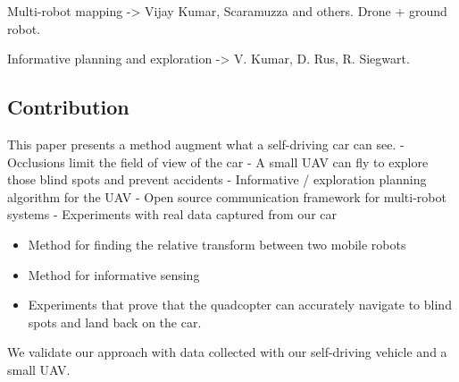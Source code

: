 Multi-robot mapping -> Vijay Kumar, Scaramuzza and others. Drone + ground robot.

Informative planning and exploration -> V. Kumar, D. Rus, R. Siegwart.

\subsection{Contribution}

This paper presents a method augment what a self-driving car can see.
- Occlusions limit the field of view of the car
- A small UAV can fly to explore those blind spots and prevent accidents
- Informative / exploration planning algorithm for the UAV
- Open source communication framework for multi-robot systems
- Experiments with real data captured from our car 

\begin{itemize}
\item
Method for finding the relative transform between two mobile robots
\item
Method for informative sensing
\item
Experiments that prove that the quadcopter can accurately navigate
to blind spots and land back on the car.
\end{itemize}

We validate our approach with data collected with our self-driving vehicle and a small UAV.
